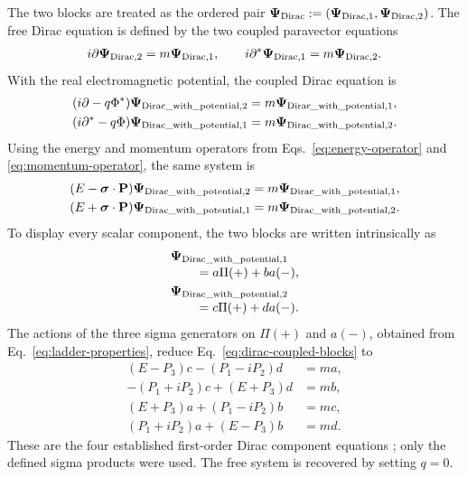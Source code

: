 \documentclass[10pt,letterpaper]{article}
\let\STAamsmathtext\text
\newcommand{\eqtext}[1]{\STAamsmathtext{\normalfont\rmfamily #1}}
\renewcommand{\text}[1]{\STAamsmathtext{\normalfont\rmfamily #1}}
\newcommand{\pv}[1]{#1}
\newcommand{\vct}[1]{\mathbf{#1}}
\newcommand{\sigv}{\vct{\pv{\bm{\sigma}}}}
\newcommand{\bPsi}{\pv{\bm{\Psi}}}
\newcommand{\conj}[1]{#1^{*}}
\begin{document}
The two blocks are treated as the ordered pair
\(\bPsi_{\eqtext{Dirac}}
:=(\bPsi_{\eqtext{Dirac},1},\bPsi_{\eqtext{Dirac},2})\).
The free Dirac equation is defined by the two coupled paravector equations
\begin{equation}
i\pv{\partial}\bPsi_{\eqtext{Dirac},2}
=m\bPsi_{\eqtext{Dirac},1},
\qquad
i\conj{\pv{\partial}}\bPsi_{\eqtext{Dirac},1}
=m\bPsi_{\eqtext{Dirac},2}.
\label{eq:dirac-free}
\end{equation}
With the real electromagnetic potential, the coupled Dirac equation is
\begin{equation}
\begin{aligned}
(i\pv{\partial}-q\conj{\pv{\Phi}})
\bPsi_{\eqtext{Dirac\_with\_potential},2}
&=m\bPsi_{\eqtext{Dirac\_with\_potential},1},\\
(i\conj{\pv{\partial}}-q\pv{\Phi})
\bPsi_{\eqtext{Dirac\_with\_potential},1}
&=m\bPsi_{\eqtext{Dirac\_with\_potential},2}.
\end{aligned}
\label{eq:dirac-coupled}
\end{equation}
Using the energy and momentum operators from Eqs.\
\eqref{eq:energy-operator} and \eqref{eq:momentum-operator}, the same system is
\begin{equation}
\begin{aligned}
(E-\sigv\cdot\vct{P})
\bPsi_{\eqtext{Dirac\_with\_potential},2}
&=m\bPsi_{\eqtext{Dirac\_with\_potential},1},\\
(E+\sigv\cdot\vct{P})
\bPsi_{\eqtext{Dirac\_with\_potential},1}
&=m\bPsi_{\eqtext{Dirac\_with\_potential},2}.
\end{aligned}
\label{eq:dirac-coupled-blocks}
\end{equation}
To display every scalar component, the two blocks are written intrinsically
as
\begin{equation}
\begin{aligned}
&\bPsi_{\eqtext{Dirac\_with\_potential},1}\\[-0.2em]
&\qquad
=a\pv{\Pi}(+)+b\pv{a}(-),\\
&\bPsi_{\eqtext{Dirac\_with\_potential},2}\\[-0.2em]
&\qquad
=c\pv{\Pi}(+)+d\pv{a}(-).
\end{aligned}
\label{eq:dirac-amplitude-expansion}
\end{equation}
The actions of the three sigma generators on
\(\pv{\Pi}(+)\) and \(\pv{a}(-)\), obtained from
Eq.\ \eqref{eq:ladder-properties}, reduce
Eq.\ \eqref{eq:dirac-coupled-blocks} to
\begin{equation}
\begin{aligned}
(E-P_3)c-(P_1-iP_2)d&=ma,\\
-(P_1+iP_2)c+(E+P_3)d&=mb,\\
(E+P_3)a+(P_1-iP_2)b&=mc,\\
(P_1+iP_2)a+(E-P_3)b&=md.
\end{aligned}
\label{eq:dirac-four-components}
\end{equation}
These are the four established first-order Dirac component equations
\cite{dirac1928,greiner2000}; only the defined sigma products were used.
The free system is recovered by setting \(q=0\).
\end{document}
